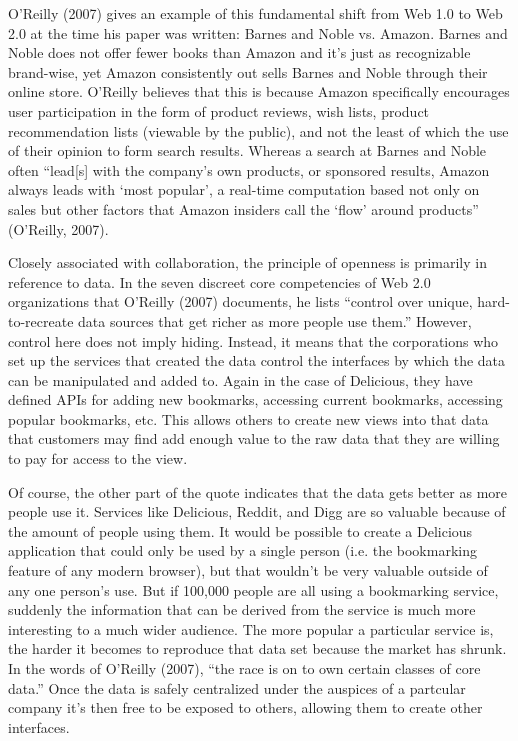 \documentclass[12pt,oneside,letterpaper]{article}
\begin{document}
O'Reilly (2007) gives an example of this fundamental shift from Web 1.0 to Web
2.0 at the time his paper was written: Barnes and Noble vs. Amazon.  Barnes and
Noble does not offer fewer books than Amazon and it's just as recognizable
brand-wise, yet Amazon consistently out sells Barnes and Noble through their
online store.  O'Reilly believes that this is because Amazon specifically
encourages user participation in the form of product reviews, wish lists,
product recommendation lists (viewable by the public), and not the least of
which the use of their opinion to form search results.  Whereas a search
at Barnes and Noble often ``lead[s] with the company's own products, or
sponsored results, Amazon always leads with `most popular', a real-time
computation based not only on sales but other factors that Amazon insiders call
the `flow' around products'' (O'Reilly, 2007).

Closely associated with collaboration, the principle of openness is primarily in
reference to data.  In the seven discreet core competencies of Web 2.0
organizations that O'Reilly (2007) documents, he lists ``control over unique,
hard-to-recreate data sources that get richer as more people use them.''
However, control here does not imply hiding.  Instead, it means that the
corporations who set up the services that created the data control the
interfaces by which the data can be manipulated and added to. Again in the case
of Delicious, they have defined APIs for adding new bookmarks, accessing current
bookmarks, accessing popular bookmarks, etc.  This allows others to create new
views into that data that customers may find add enough value to the raw data
that they are willing to pay for access to the view.

Of course, the other part of the quote indicates that the data gets better as
more people use it.  Services like Delicious, Reddit, and Digg are so valuable
because of the amount of people using them.  It would be possible to create a
Delicious application that could only be used by a single person (i.e. the
bookmarking feature of any modern browser), but that wouldn't be very valuable
outside of any one person's use.  But if 100,000 people are all using a
bookmarking service, suddenly the information that can be derived from the
service is much more interesting to a much wider audience.  The more popular a
particular service is, the harder it becomes to reproduce that data set because
the market has shrunk.  In the words of O'Reilly (2007), ``the race is on to own certain
classes of core data.''  Once the data is safely centralized under the auspices
of a partcular company it's then free to be exposed to others, allowing them to
create other interfaces.
\end{document}

